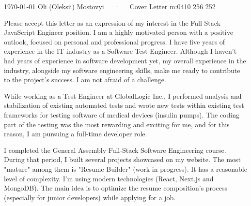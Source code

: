 \documentclass[10pt, a4paper]{awesome-cv}
\begin{document}
\makecvheader[R]

\makecvfooter
  {\today}
  {Oli (Oleksii) Mostovyi~~~·~~~Cover Letter}
  {m:0410 256 252}

\makelettertitle

\begin{cvletter}
Please accept this letter as an expression of my interest in the Full Stack JavaScript Engineer position.
I am a highly motivated person with a positive outlook, focused on personal and professional progress. I have five years of experience in the IT industry as a Software Test Engineer. Although I haven't had years of experience in software development yet, my overall experience in the industry, alongside my software engineering skills, make me ready to contribute to the project's success. I am not afraid of a challenge. 

While working as a Test Engineer at GlobalLogic Inc., I performed analysis and stabilization of existing automated tests and wrote new tests within existing test frameworks for testing software of medical devices (insulin pumps). The coding part of the testing was the most rewarding and exciting for me, and for this reason, I am pursuing a full‐time developer role. 

I completed the General Assembly Full‐Stack Software Engineering course. During that period, I built several projects showcased on my website. The most "mature" among them is "Resume Builder" (work in progress). It has a reasonable level of complexity. I'm using modern technologies (React, Next.js and MongoDB). The main idea is to optimize the resume composition's process (especially for junior developers) while applying for a job. 


\end{cvletter}
\end{document}
